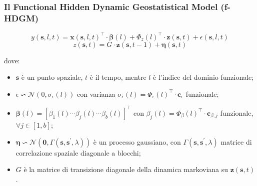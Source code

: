 \begin{frame}
	\frametitle{Il Functional Hidden Dynamic Geostatistical Model (f-HDGM)}
	
	\begin{equation*}
		y(\mathbf{s}, l, t) = \mathbf{x}(\mathbf{s}, l, t)^\top\cdot\boldsymbol{\beta}(l) + \Phi_z(l)^\top\cdot \mathbf{z}(\mathbf{s}, t) + \epsilon(\mathbf{s}, l, t)
	\end{equation*}
	\begin{equation*}
		z(\mathbf{s}, t) = G\cdot\mathbf{z}(\mathbf{s}, t-1) + \boldsymbol{\eta}(\mathbf{s}, t)
	\end{equation*}
	
	dove:
	\begin{itemize}
		\justifying
		\item $\mathbf{s}$ è un punto spaziale, $t$ è il tempo, mentre $l$ è l'indice del dominio funzionale;
		\item $\epsilon\backsim \mathcal{N}(0, \sigma_\epsilon(l))$ con varianza $\sigma_\epsilon(l) = \Phi_\epsilon(l)^\top\cdot\mathbf{c}_\epsilon$ funzionale;
		\item $\boldsymbol{\beta}(l) = \left[\beta_1(l)\cdots\beta_j(l)\cdots\beta_b(l)\right]^\top$ con $\beta_j(l) = \Phi_\beta(l)^\top\cdot\mathbf{c}_{\beta, j}$ funzionale, $\forall j\in[1, b]$;
		\item $\boldsymbol{\eta}\backsim\mathcal{N}(\mathbf{0},\Gamma(\mathbf{s}, \mathbf{s}^\prime, \lambda))$ è un processo gaussiano, con $\Gamma(\mathbf{s}, \mathbf{s}^\prime, \lambda)$ matrice di correlazione spaziale diagonale a blocchi;
		\item $G$ è la matrice di transizione diagonale della dinamica markoviana su $\mathbf{z}(\mathbf{s}, t)$.
	\end{itemize}

\end{frame}